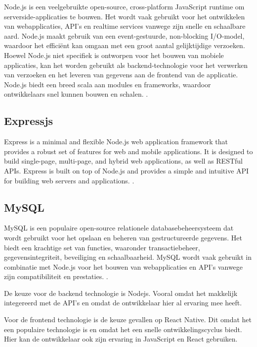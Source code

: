     Node.js is een veelgebruikte open-source, cross-platform JavaScript runtime om serverside-applicaties te bouwen. 
    Het wordt vaak gebruikt voor het ontwikkelen van webapplicaties, API's en realtime services vanwege zijn snelle en schaalbare aard. Node.js maakt gebruik van een event-gestuurde, 
    non-blocking I/O-model, waardoor het efficiënt kan omgaan met een groot aantal gelijktijdige verzoeken. Hoewel Node.js niet specifiek is ontworpen voor het bouwen van mobiele applicaties, 
    kan het worden gebruikt als backend-technologie voor het verwerken van verzoeken en het leveren van gegevens aan de frontend van de applicatie. Node.js biedt een breed scala aan modules en frameworks, 
    waardoor ontwikkelaars snel kunnen bouwen en schalen. \autocite{nodejs_docs}.

    \subsection{Expressjs}

    Express is a minimal and flexible Node.js web application framework that provides a robust set of features for web and mobile applications. 
    It is designed to build single-page, multi-page, and hybrid web applications, as well as RESTful APIs. Express is built on top of Node.js and provides a simple and intuitive API for building web servers and applications. \autocite{express_docs}.

    \subsection{MySQL}

    MySQL is een populaire open-source relationele databasebeheersysteem dat wordt gebruikt voor het opslaan en beheren van gestructureerde gegevens.
    Het biedt een krachtige set van functies, waaronder transactiebeheer, gegevensintegriteit, beveiliging en schaalbaarheid. MySQL wordt vaak gebruikt in combinatie met Node.js voor het bouwen van webapplicaties en API's vanwege zijn compatibiliteit en prestaties. 
    \autocite{mysql_docs}.

    \hspace{2cm}

    De keuze voor de backend technologie is Nodejs. Vooral omdat het makkelijk integereerd met de API's en omdat de ontwikkelaar hier al ervaring mee heeft.

    Voor de frontend technologie is de keuze gevallen op React Native. Dit omdat het een populaire technologie is en omdat het een snelle ontwikkelingscyclus biedt. 
    Hier kan de ontwikkelaar ook zijn ervaring in JavaScript en React gebruiken.

